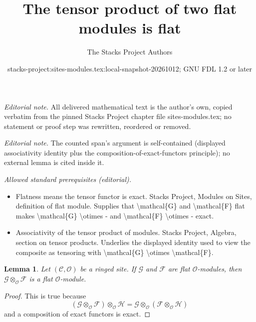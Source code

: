 \documentclass[10pt,a4paper]{amsart}
\title{The tensor product of two flat modules is flat}
\author{The Stacks Project Authors}
\date{stacks-project:sites-modules.tex:local-snapshot-20261012; GNU FDL 1.2 or later}
\theoremstyle{plain}
\newtheorem{lemma}[subsection]{Lemma}
\theoremstyle{definition}
\theoremstyle{remark}
\numberwithin{equation}{subsection}
\begin{document}
\maketitle
\noindent\textit{Editorial note.} All delivered mathematical text is the author's own, copied verbatim from the pinned Stacks Project chapter file sites-modules.tex; no statement or proof step was rewritten, reordered or removed.\par\medskip
\noindent\textit{Editorial note.} The counted span's argument is self-contained (displayed associativity identity plus the composition-of-exact-functors principle); no external lemma is cited inside it.\par\medskip
\noindent\textit{Allowed standard prerequisites (editorial).}\begin{itemize}
\item Flatness means the tensor functor is exact. Stacks Project, Modules on Sites, definition of flat module. Supplies that \textbackslash{}mathcal\{G\} and \textbackslash{}mathcal\{F\} flat makes \textbackslash{}mathcal\{G\} \textbackslash{}otimes - and \textbackslash{}mathcal\{F\} \textbackslash{}otimes - exact.
\item Associativity of the tensor product of modules. Stacks Project, Algebra, section on tensor products. Underlies the displayed identity used to view the composite as tensoring with \textbackslash{}mathcal\{G\} \textbackslash{}otimes \textbackslash{}mathcal\{F\}.
\end{itemize}\medskip
\begin{lemma}
\label{lemma-tensor-flats}
Let $(\mathcal{C}, \mathcal{O})$ be a ringed site. If $\mathcal{G}$ and
$\mathcal{F}$ are flat $\mathcal{O}$-modules, then
$\mathcal{G} \otimes_\mathcal{O} \mathcal{F}$ is a flat $\mathcal{O}$-module.
\end{lemma}

\begin{proof}
This is true because
$$
(\mathcal{G} \otimes_\mathcal{O} \mathcal{F}) \otimes_\mathcal{O} \mathcal{H}
=
\mathcal{G} \otimes_\mathcal{O} (\mathcal{F} \otimes_\mathcal{O} \mathcal{H})
$$
and a composition of exact functors is exact.
\end{proof}
\end{document}
